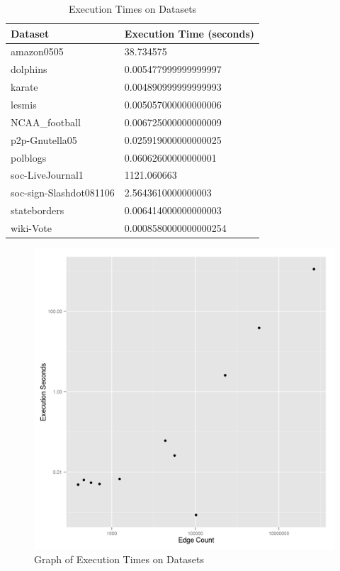 \documentclass{report}
\begin{document}
\begin{table}
  \centering
  \begin{tabular}{ll}
    \toprule
    Dataset & Execution Time (seconds)\\
    \midrule
    amazon0505 & 38.734575 \\
    dolphins & 0.005477999999999997 \\
    karate & 0.004890999999999993 \\
    lesmis & 0.005057000000000006 \\
    NCAA\_football & 0.006725000000000009 \\
    p2p-Gnutella05 & 0.025919000000000025 \\
    polblogs & 0.06062600000000001 \\
    soc-LiveJournal1 & 1121.060663 \\
    soc-sign-Slashdot081106 & 2.5643610000000003 \\
    stateborders & 0.006414000000000003 \\
    wiki-Vote & 0.0008580000000000254 \\
    \bottomrule
  \end{tabular}
  \caption{Execution Times on Datasets}
  \label{execution-times-table}
\end{table}
\begin{figure}
  \centering
  \includegraphics[scale=0.5]{performance.png}
  \caption{Graph of Execution Times on Datasets}
  \label{execution-times-graph}
\end{figure}
\end{document}
